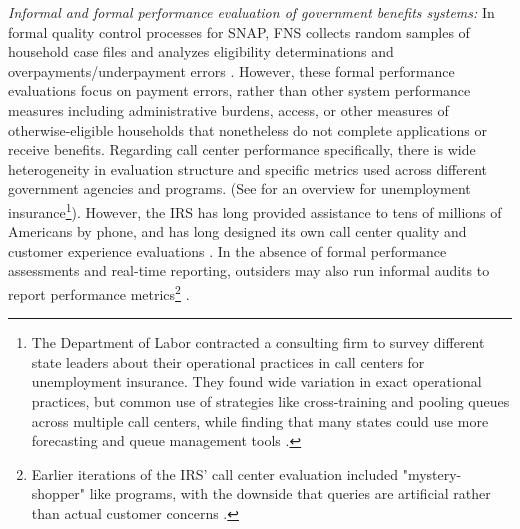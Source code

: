\documentclass[manuscript,screen,authorversion]{acmart}
\begin{document}
\textit{Informal and formal performance evaluation of government benefits systems:}  
In formal quality control processes for SNAP, FNS collects random samples of household case files and analyzes eligibility determinations and overpayments/underpayment errors \citep{snapqc}. However, these formal performance evaluations focus on payment errors, rather than other system performance measures including administrative burdens, access, or other measures of otherwise-eligible households that nonetheless do not complete applications or receive benefits. Regarding call center performance specifically, there is wide heterogeneity in evaluation structure and specific metrics used across different government agencies and programs. (See \citet{Coffey_2017} for an overview for unemployment insurance\footnote{The Department of Labor contracted a consulting firm to survey different state leaders about their operational practices in call centers for unemployment insurance. They found wide variation in exact operational practices, but common use of strategies like cross-training and pooling queues across multiple call centers, while finding that many states could use more forecasting and queue management tools \citep{Coffey_2017}.}). However, the IRS has long provided assistance to tens of millions of Americans by phone, and has long designed its own call center quality and customer experience evaluations \citep{rosage2004evolution}.  %
In the absence of formal performance assessments and real-time reporting, outsiders may also run informal audits to report performance metrics\footnote{Earlier iterations of the IRS' call center evaluation included "mystery-shopper" like programs, with the downside that queries are artificial rather than actual customer concerns \citep{rosage2004evolution}.} \citep{dube2021note}.
\end{document}
